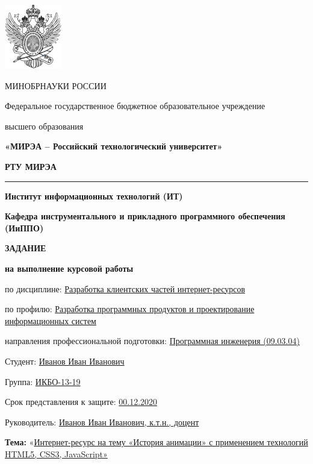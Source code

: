 \documentclass[12pt, a4paper]{extarticle}
\begin{document}
\fontsize{12pt}{1.08}\selectfont

\begin{center}
\includegraphics[width=0.97917in,height=1.10417in]{Images/mirea.png}

\setlength{\parskip}{6pt}
МИНОБРНАУКИ РОССИИ 

Федеральное государственное бюджетное образовательное учреждение
\setlength{\parskip}{0pt}

высшего образования

\textbf{«МИРЭА -- Российский технологический университет»}

\fontsize{16pt}{1.08}\selectfont
\textbf{РТУ МИРЭА}
\fontsize{12pt}{1.08}\selectfont

\setlength{\parskip}{6pt}
\noindent\rule{\textwidth}{2pt}

\textbf{Институт информационных технологий (ИТ)}
\setlength{\parskip}{0pt}

\textbf{Кафедра инструментального и прикладного программного обеспечения (ИиППО)}

\bigskip
\textbf{ЗАДАНИЕ}

\textbf{на выполнение курсовой работы}

\end{center}

\justifying

\setlength{\parindent}{0in}
по дисциплине: \uline{Разработка клиентских частей
интернет-ресурсов}

по профилю: \uline{Разработка программных продуктов и проектирование
информационных систем}

направления профессиональной подготовки: \uline{Программная
инженерия (09.03.04)}

\medskip

Студент: \uline{Иванов Иван Иванович}

Группа: \uline{ИКБО-13-19}

Срок представления к защите: \uline{00.12.2020}

Руководитель: \uline{Иванов Иван Иванович, к.т.н., доцент}

\bigskip

\textbf{Тема:} «\uline{Интернет-ресурс на тему «История анимации» с
применением технологий HTML5, CSS3, JavaScript»}
\end{document}
